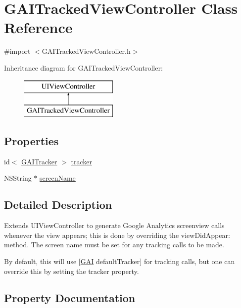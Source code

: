 \hypertarget{interface_g_a_i_tracked_view_controller}{}\section{G\+A\+I\+Tracked\+View\+Controller Class Reference}
\label{interface_g_a_i_tracked_view_controller}


{\ttfamily \#import $<$G\+A\+I\+Tracked\+View\+Controller.\+h$>$}

Inheritance diagram for G\+A\+I\+Tracked\+View\+Controller\+:\begin{figure}[H]
\begin{center}
\leavevmode
\includegraphics[height=2.000000cm]{interface_g_a_i_tracked_view_controller}
\end{center}
\end{figure}
\subsection*{Properties}
\begin{DoxyCompactItemize}
\item 
id$<$ \hyperlink{protocol_g_a_i_tracker-p}{G\+A\+I\+Tracker} $>$ \hyperlink{interface_g_a_i_tracked_view_controller_aada15f00d99216066e81fb4328496179}{tracker}
\item 
N\+S\+String $\ast$ \hyperlink{interface_g_a_i_tracked_view_controller_ac5605ccd95a6ac6076383eac9b1b7500}{screen\+Name}
\end{DoxyCompactItemize}


\subsection{Detailed Description}
Extends U\+I\+View\+Controller to generate Google Analytics screenview calls whenever the view appears; this is done by overriding the {\ttfamily view\+Did\+Appear\+:} method. The screen name must be set for any tracking calls to be made.

By default, this will use \mbox{[}\hyperlink{interface_g_a_i}{G\+AI} default\+Tracker\mbox{]} for tracking calls, but one can override this by setting the tracker property. 

\subsection{Property Documentation}
\mbox{\label{interface_g_a_i_tracked_view_controller_ac5605ccd95a6ac6076383eac9b1b7500}} 
